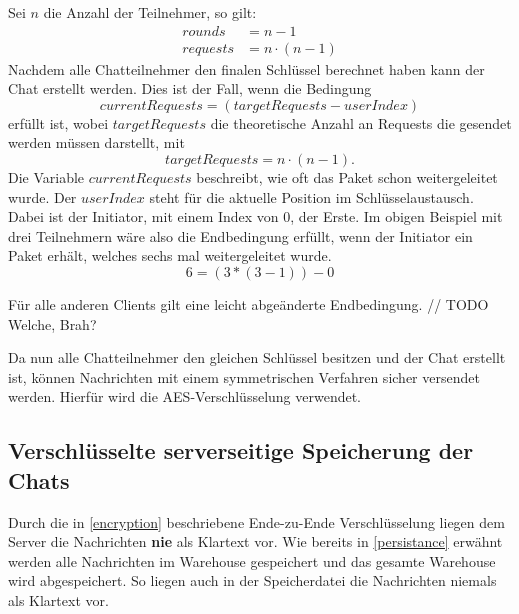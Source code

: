 Sei $n$ die Anzahl der Teilnehmer, so gilt:
\[
\begin{split}
  rounds &= n - 1\\
  requests &= n \cdot (n - 1)  
\end{split}
\]
Nachdem alle Chatteilnehmer den finalen Schlüssel berechnet haben kann der Chat erstellt werden. Dies ist der Fall,
wenn die Bedingung $$ currentRequests = (targetRequests - userIndex) $$ erfüllt ist, wobei $targetRequests$ die theoretische Anzahl
an Requests die gesendet werden müssen darstellt, mit $$targetRequests = n \cdot (n-1).$$
Die Variable $currentRequests$ beschreibt, wie oft das Paket schon weitergeleitet wurde.
Der $userIndex$ steht für die aktuelle Position im Schlüsselaustausch. Dabei ist der Initiator, mit einem Index von 0, der Erste.
Im obigen Beispiel mit drei Teilnehmern wäre also die Endbedingung erfüllt, wenn der Initiator ein Paket erhält, 
welches sechs mal weitergeleitet wurde.
$$ 6 = (3 * (3 - 1)) - 0 $$



Für alle anderen Clients gilt eine leicht abgeänderte Endbedingung. // TODO Welche, Brah?

Da nun alle Chatteilnehmer den gleichen Schlüssel besitzen und der Chat erstellt ist, können Nachrichten mit 
einem symmetrischen Verfahren sicher versendet werden. Hierfür wird die AES-Verschlüsselung verwendet.

\author{Troy Keßler}
\subsection{Verschlüsselte serverseitige Speicherung der Chats}
Durch die in \ref{encryption} beschriebene Ende-zu-Ende Verschlüsselung liegen dem Server die Nachrichten \textbf{nie} als Klartext vor.
Wie bereits in \ref{persistance} erwähnt werden alle Nachrichten im Warehouse gespeichert und das gesamte Warehouse wird abgespeichert.
So liegen auch in der Speicherdatei die Nachrichten niemals als Klartext vor.
